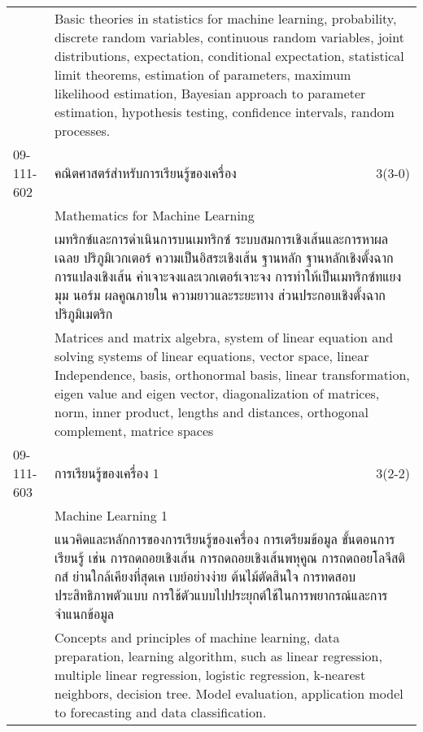 \begin{longtable}{p{}p{}r{}}
&  \multicolumn{2}{p{0.75\textwidth}}{Basic theories in statistics for machine learning, probability, discrete random variables, continuous random variables, joint distributions, expectation, conditional expectation, statistical limit theorems, estimation of parameters, maximum likelihood estimation, Bayesian approach to parameter estimation, hypothesis testing, confidence intervals, random processes.} \vspace{8mm} \\*
09-111-602 & คณิตศาสตร์สำหรับการเรียนรู้ของเครื่อง & 3(3-0)\\*
 & Mathematics for Machine Learning & \phantom{x} \vspace{3mm} \\*
&  \multicolumn{2}{p{0.75\textwidth}}{เมทริกซ์และการดำเนินการบนเมทริกซ์ ระบบสมการเชิงเส้นและการหาผลเฉลย ปริภูมิเวกเตอร์ ความเป็นอิสระเชิงเส้น ฐานหลัก ฐานหลักเชิงตั้งฉาก การแปลงเชิงเส้น ค่าเจาะจงและเวกเตอร์เจาะจง การทำให้เป็นเมทริกซ์ทแยงมุม นอร์ม ผลคูณภายใน ความยาวและระยะทาง ส่วนประกอบเชิงตั้งฉาก ปริภูมิเมตริก } \vspace{3mm} \\*
&  \multicolumn{2}{p{0.75\textwidth}}{Matrices and matrix algebra, system of linear equation and solving systems of linear equations, vector space, linear Independence, basis, orthonormal basis, linear transformation, eigen value and eigen vector, diagonalization of matrices, norm, inner product, lengths and distances, orthogonal complement, matrice spaces} \vspace{8mm} \\*
09-111-603 & การเรียนรู้ของเครื่อง 1 & 3(2-2)\\*
 & Machine Learning 1 & \phantom{x} \vspace{3mm} \\*
&  \multicolumn{2}{p{0.75\textwidth}}{แนวคิดและหลักการของการเรียนรู้ของเครื่อง การเตรียมข้อมูล ขั้นตอนการเรียนรู้ เช่น การถดถอยเชิงเส้น การถดถอยเชิงเส้นพหุคูณ การถดถอยโลจีสติกส์ ย่านใกล้เคียงที่สุดเค เบย์อย่างง่าย ต้นไม้ตัดสินใจ การทดสอบประสิทธิภาพตัวแบบ การใช้ตัวแบบไปประยุกต์ใช้ในการพยากรณ์และการจำแนกข้อมูล} \vspace{3mm} \\*
&  \multicolumn{2}{p{0.75\textwidth}}{Concepts and principles of machine learning, data preparation, learning algorithm, such as linear regression, multiple linear regression, logistic regression, k-nearest neighbors, decision tree. Model evaluation, application model to forecasting and data classification.} \vspace{8mm} \\*

\end{longtable}
